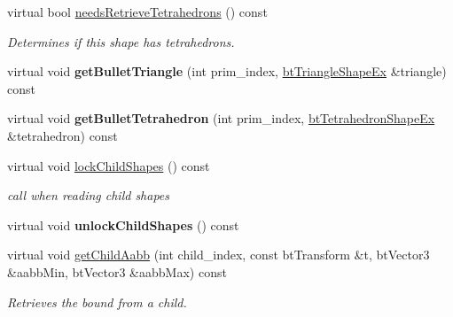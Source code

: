 \begin{DoxyCompactItemize}
virtual bool \hyperlink{classbtGImpactMeshShape_abe38ef4a56534abcd43dbe2e45e46157}{needs\+Retrieve\+Tetrahedrons} () const
\begin{DoxyCompactList}\small\item\em Determines if this shape has tetrahedrons. \end{DoxyCompactList}\item 
\mbox{\label{classbtGImpactMeshShape_a938b4191a80e64b59568c68cd4afa14f}} 
virtual void {\bfseries get\+Bullet\+Triangle} (int prim\+\_\+index, \hyperlink{classbtTriangleShapeEx}{bt\+Triangle\+Shape\+Ex} \&triangle) const
\item 
\mbox{\label{classbtGImpactMeshShape_a22e730f292d812e680f6bf503231d8d4}} 
virtual void {\bfseries get\+Bullet\+Tetrahedron} (int prim\+\_\+index, \hyperlink{classbtTetrahedronShapeEx}{bt\+Tetrahedron\+Shape\+Ex} \&tetrahedron) const
\item 
\mbox{\label{classbtGImpactMeshShape_a89c9a1dba1b1ea3d74b4545fd5f92ae0}} 
virtual void \hyperlink{classbtGImpactMeshShape_a89c9a1dba1b1ea3d74b4545fd5f92ae0}{lock\+Child\+Shapes} () const
\begin{DoxyCompactList}\small\item\em call when reading child shapes \end{DoxyCompactList}\item 
\mbox{\label{classbtGImpactMeshShape_afd80219b051a71867198e4b15d6e1c1c}} 
virtual void {\bfseries unlock\+Child\+Shapes} () const
\item 
\mbox{\label{classbtGImpactMeshShape_a8b38c48b69c6eb790365b0593655975b}} 
virtual void \hyperlink{classbtGImpactMeshShape_a8b38c48b69c6eb790365b0593655975b}{get\+Child\+Aabb} (int child\+\_\+index, const bt\+Transform \&t, bt\+Vector3 \&aabb\+Min, bt\+Vector3 \&aabb\+Max) const
\begin{DoxyCompactList}\small\item\em Retrieves the bound from a child. \end{DoxyCompactList}\item 
\mbox{\label{classbtGImpactMeshShape_ae268fb9f2813b1fa4171d87e201c37a7}} 

\end{DoxyCompactItemize}
